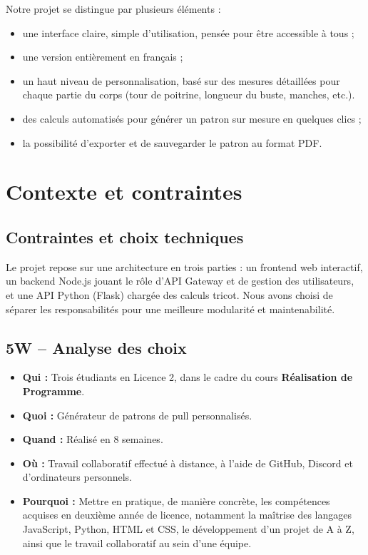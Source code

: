 \documentclass{article}
\begin{document}
Notre projet se distingue par plusieurs éléments :
\begin{itemize}
\item une interface claire, simple d’utilisation, pensée pour être accessible à tous ;
\item une version entièrement en français ;
\item un haut niveau de personnalisation, basé sur des mesures détaillées pour chaque partie du corps (tour de poitrine, longueur du buste, manches, etc.).
\item des calculs automatisés pour générer un patron sur mesure en quelques clics ;
\item la possibilité d’exporter et de sauvegarder le patron au format PDF.
\end{itemize}

\section{Contexte et contraintes}
\subsection{Contraintes et choix techniques}

Le projet repose sur une architecture en trois parties : un frontend web interactif, un backend Node.js jouant le rôle d'API Gateway et de gestion des utilisateurs, et une API Python (Flask) chargée des calculs tricot. Nous avons choisi de séparer les responsabilités pour une meilleure modularité et maintenabilité.

\subsection*{5W – Analyse des choix}
\begin{itemize}
    \item \textbf{Qui :} Trois étudiants en Licence 2, dans le cadre du cours \textbf{Réalisation de Programme}.
    \item \textbf{Quoi :} Générateur de patrons de pull personnalisés.
    \item \textbf{Quand :} Réalisé en 8 semaines.
    \item \textbf{Où :} Travail collaboratif effectué à distance, à l’aide de GitHub, Discord et d’ordinateurs personnels.
    \item \textbf{Pourquoi :} Mettre en pratique, de manière concrète, les compétences acquises en deuxième année de licence, notamment la maîtrise des langages JavaScript, Python, HTML et CSS, le développement d’un projet de A à Z, ainsi que le travail collaboratif au sein d’une équipe.
\end{itemize}
\end{document}
